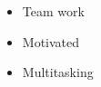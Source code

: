 \twocolumnsection
{
    \begin{skills}
\end{skills}}
{
    \vspace{1em}
    \begin{itemize}
        \item Team work
        \item Motivated
        \item Multitasking
    \end{itemize}
}
